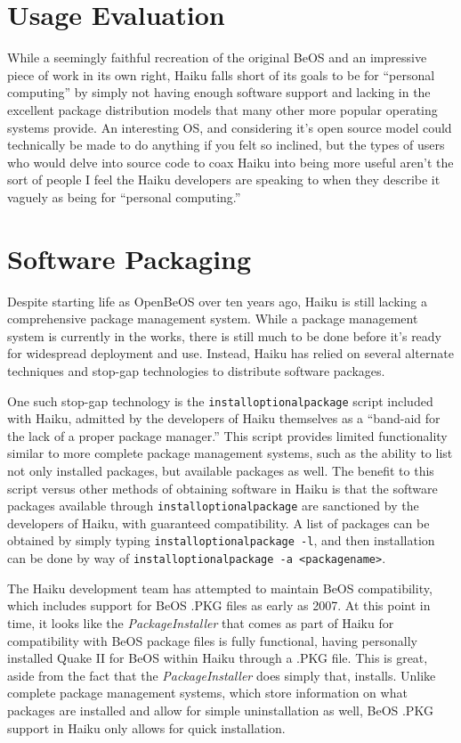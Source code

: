 \documentclass{article}
\begin{document}
\section{Usage Evaluation}

While a seemingly faithful recreation of the original BeOS and an
impressive piece of work in its own right, Haiku falls short of its
goals to be for ``personal computing'' by simply not having enough
software support and lacking in the excellent package distribution
models that many other more popular operating systems provide.  An
interesting OS, and considering it's open source model could
technically be made to do anything if you felt so inclined, but the
types of users who would delve into source code to coax Haiku into
being more useful aren't the sort of people I feel the Haiku
developers are speaking to when they describe it vaguely as being for
``personal computing.''

\section{Software Packaging}

Despite starting life as OpenBeOS over ten years ago, Haiku is still
lacking a comprehensive package management system. While a package
management system is currently in the works\cite{HaikuFuturePkgMan},
there is still much to be done before it's ready for widespread
deployment and use\cite{HaikuPkgTodo}. Instead, Haiku has relied on
several alternate techniques and stop-gap technologies to distribute
software packages.

One such stop-gap technology is the \texttt{installoptionalpackage}
script included with Haiku, admitted by the developers of Haiku
themselves as a ``band-aid for the lack of a proper package
manager.''\cite{InstallOptionalPackage} This script provides limited
functionality similar to more complete package management systems,
such as the ability to list not only installed packages, but available
packages as well. The benefit to this script versus other methods of
obtaining software in Haiku is that the software packages available
through \texttt{installoptionalpackage} are sanctioned by the
developers of Haiku, with guaranteed compatibility. A list of packages
can be obtained by simply typing \texttt{installoptionalpackage -l},
and then installation can be done by way
of \texttt{installoptionalpackage -a <packagename>}.

The Haiku development team has attempted to maintain BeOS
compatibility, which includes support for BeOS .PKG files as early as
2007.\cite{OpeningPkgFiles} At this point in time, it looks like
the \textit{PackageInstaller} that comes as part of Haiku for
compatibility with BeOS package files is fully functional, having
personally installed Quake II for BeOS within Haiku through a .PKG
file. This is great, aside from the fact that
the \textit{PackageInstaller} does simply that, installs. Unlike
complete package management systems, which store information on what
packages are installed and allow for simple uninstallation as well,
BeOS .PKG support in Haiku only allows for quick installation.
\end{document}
